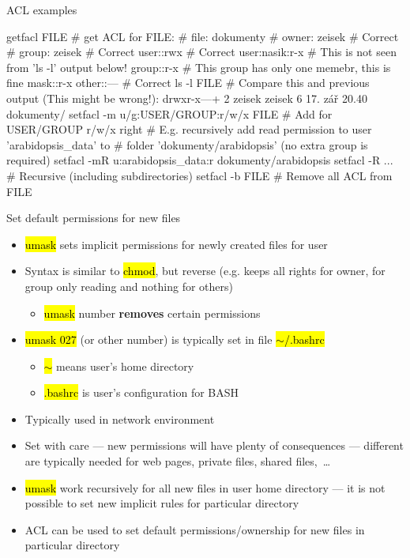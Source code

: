 \documentclass[compress, ucs, xelatex, 11pt, xcolor=svgnames, aspectratio=169,
	hyperref={
		bookmarks=true,
		unicode=true,
		colorlinks=true,
		pdftitle={Linux, command line and MetaCentrum},
		plainpages=false,
		pdfauthor={Vojtech Zeisek},
		pdfsubject={Course about use of Linux command line, writing shell scripts and using MetaCentrum of CESNET},
		pdfcreator={XeLaTeX},
		pdfkeywords={Linux, GNU, BASH, shell, command line, MetaCentrum},
		linkcolor=DarkRed, %
		anchorcolor=DarkBlue, %
		citecolor=Indigo, %
		filecolor=NavyBlue, %
		menucolor=DarkMagenta, %
		urlcolor=DarkBlue, %
		pdftex},
	url={hyphens, lowtilde} %
	]{beamer}
\renewcommand{\texttt}[1]{\hl{\ttfamily #1}}
\begin{document}
\begin{frame}[fragile]{ACL examples}
	\begin{bashcode}
    getfacl FILE # get ACL for FILE:
    # file: dokumenty
    # owner: zeisek # Correct
    # group: zeisek # Correct
    user::rwx       # Correct
    user:nasik:r-x  # This is not seen from 'ls -l' output below!
    group::r-x      # This group has only one memebr, this is fine
    mask::r-x
    other::---      # Correct
    ls -l FILE # Compare this and previous output (This might be wrong!):
    drwxr-x---+  2 zeisek zeisek     6 17. zář 20.40 dokumenty/
    setfacl -m u/g:USER/GROUP:r/w/x FILE # Add for USER/GROUP r/w/x right
    # E.g. recursively add read permission to user 'arabidopsis_data' to
    # folder 'dokumenty/arabidopsis' (no extra group is required)
    setfacl -mR u:arabidopsis_data:r dokumenty/arabidopsis
    setfacl -R ... # Recursive (including subdirectories)
    setfacl -b FILE # Remove all ACL from FILE
	\end{bashcode}
\end{frame}

\begin{frame}{Set default permissions for new files}
	\begin{itemize}
		\item \texttt{umask} sets implicit permissions for newly created files for user
		\item Syntax is similar to \texttt{chmod}, but reverse (e.g. \texttt{027} keeps all rights for owner, for group only reading and nothing for others)
		\begin{itemize}
			\item \texttt{umask} number \textbf{removes} certain permissions
		\end{itemize}
		\item \texttt{umask 027} (or other number) is typically set in file \texttt{$\sim$/.bashrc}
		\begin{itemize}
			\item \texttt{$\sim$} means user's home directory
			\item \texttt{.bashrc} is user's configuration for BASH
		\end{itemize}
		\item Typically used in network environment
		\item Set with care --- new permissions will have plenty of consequences --- different are typically needed for web pages, private files, shared files,~\ldots
		\item \texttt{umask} work recursively for all new files in user home directory --- it is not possible to set new implicit rules for particular directory
		\item ACL can be used to set default permissions/ownership for new files in particular directory
	\end{itemize}
\end{frame}
\end{document}
